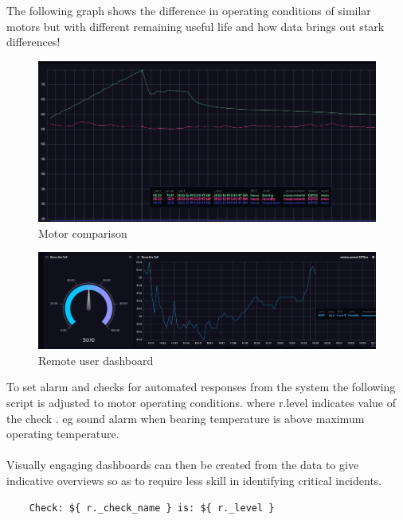 \pagebreak

 The following graph shows the difference in operating conditions of similar motors but with different remaining useful life and how data brings out stark differences!


\begin{figure}[!h]
	\includegraphics[width=1.0\linewidth]{Figures/normal_overheating}
	\caption{Motor comparison}
\end{figure}

\pagebreak
\begin{figure}[!h]
	\includegraphics[width=1.0\linewidth]{Figures/remote_monitoring}
	\caption{Remote user dashboard}
\end{figure}
To set alarm and checks for automated responses from the system the following script is adjusted to motor operating conditions. where r.level indicates value of the check . eg sound  alarm when bearing temperature is above maximum operating temperature.

\paragraph*{}

Visually engaging dashboards can then be created from the data to give indicative overviews so as to require less skill in identifying critical incidents.

\begin{lstlisting}
	Check: ${ r._check_name } is: ${ r._level }
\end{lstlisting}





